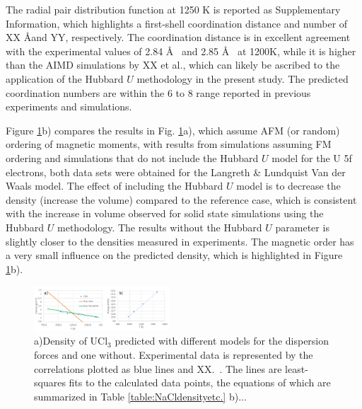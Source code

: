 \documentclass[preprint,3p,10pt,twocolumn,number,sort&compress]{elsarticle}
\begin{document}
The radial pair distribution function at 1250 K is reported as Supplementary Information, which highlights a first-shell coordination distance and number of XX \AA and YY, respectively. The coordination distance is in excellent agreement with the experimental values of 2.84 \AA~\cite{} and 2.85 \AA~\cite{} at 1200K, while it is higher than the AIMD simulations by XX et al., which can likely be ascribed to the application of the Hubbard $U$ methodology in the present study. The predicted coordination numbers are within the 6 to 8 range reported in previous experiments and simulations. %
 
Figure \ref{fig:UCl3density}b) compares the results in Fig. \ref{fig:UCl3density}a), which assume AFM (or random) ordering of magnetic moments, with results from simulations assuming FM ordering and simulations that do not include the Hubbard $U$ model for the U 5f electrons, both data sets were obtained for the Langreth \& Lundquist Van der Waals model. 
 The effect of including the Hubbard $U$ model is to decrease the density (increase the volume) compared to the reference case, which is consistent with the increase in volume observed for solid state simulations using the Hubbard $U$ methodology. The results without the Hubbard $U$ parameter is slightly closer to the densities measured in experiments. The magnetic order has a very small influence on the predicted density, which is highlighted in Figure \ref{fig:UCl3density}b). %

\begin{figure}[htb]
\centering
\includegraphics[width=0.45\textwidth]{./figures/FIG4.pdf}
\caption{a)Density of UCl$_3$ predicted with different models for the dispersion forces and one without. Experimental data is represented by the correlations plotted as blue lines and XX.~\cite{}. The lines are least-squares fits to the calculated data points, the equations of which are summarized in Table \ref{table:NaCldensityetc.} b)...} 
\label{fig:UCl3density}
\end{figure}
\end{document}
